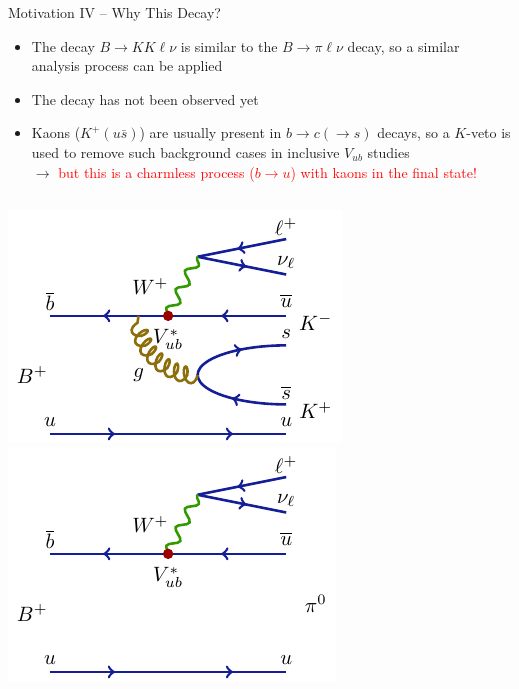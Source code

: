 \documentclass[serif]{beamer}
\begin{document}

\begin{frame}[t]{Motivation IV -- Why This Decay?}
\small
\vspace{-3mm}
\begin{block}{}
	\begin{itemize}
		\item The decay $B \rightarrow KK\ell\nu$ is similar to the $B \rightarrow \pi\ell\nu$ decay, so a similar analysis process can be applied
		\item The decay has not been observed yet
		\item Kaons ($K^+(u \bar s)$) are usually present in $b \to c (\to s)$ decays, so a $K$-veto is used to remove such background cases in inclusive $V_{ub}$ studies\\$\to$ \textcolor{red}{but this is a charmless process ($b \to u$) with kaons in the final state!}
	\end{itemize}
\end{block}

\begin{columns}
	\includegraphics[scale=0.9]{texfig/B2KKlnu}
	\includegraphics[scale=0.9]{texfig/B2pilnu}
\end{columns}


\end{frame}
\end{document}
